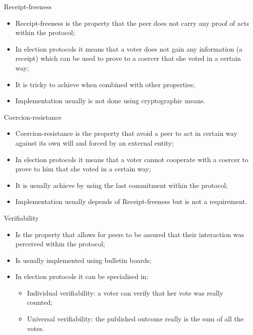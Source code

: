\documentclass[12pt,table,xcolor={dvipsnames}]{beamer}
\begin{document}
\begin{frame}{Receipt-freeness}
\begin{itemize}
\item Receipt-freeness is the property that the peer does not carry any proof of acts within the protocol;\pause
\item In election protocols it means that a voter does not gain any information (a receipt) which can be used to prove to a coercer that she voted in a certain way;\pause
\item It is tricky to achieve when combined with other properties;\pause
\item Implementation usually is not done using cryptographic means.
\end{itemize}
\end{frame}

\begin{frame}{Coercion-resistance}
\begin{itemize}
\item Coercion-resistance is the property that avoid a peer to act in certain way against its own will and forced by an external entity;\pause
\item In election protocols it means that a voter cannot cooperate with a coercer to prove to him that she voted in a certain way;\pause
\item It is usually achieve by using the last commitment within the protocol;\pause
\item Implementation usually depends of Receipt-freeness but is not a requirement.
\end{itemize}
\end{frame}

\begin{frame}{Verifiability}
\begin{itemize}
\item Is the property that allows for peers to be assured that their interaction was perceived within the protocol;\pause
\item Is usually implemented using bulletin boards;\pause
\item In election protocols it can be specialised in:\pause
\begin{itemize}
\item Individual verifiability: a voter can verify that her vote was really counted;\pause
\item Universal verifiability: the published outcome really is the sum of all the votes.
\end{itemize}
\end{itemize}
\end{frame}
\end{document}

